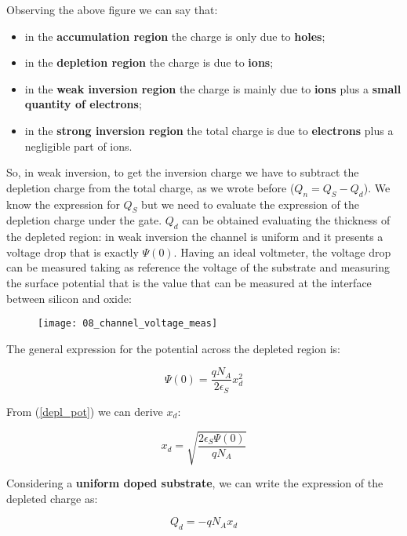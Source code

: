 \documentclass[a4paper, 12pt, twoside, openright]{report}
\begin{document}
Observing the above figure we can say that:

\begin{itemize}
\item in the \textbf{accumulation region} the charge is only due to \textbf{holes};
\item in the \textbf{depletion region} the charge is due to \textbf{ions};
\item in the \textbf{weak inversion region} the charge is mainly due to \textbf{ions} plus a \textbf{small quantity of electrons};
\item in the \textbf{strong inversion region} the total charge is due to \textbf{electrons} plus a negligible part of ions.
\end{itemize}

So, in weak inversion, to get the inversion charge we have to subtract the depletion charge from the total charge, as we wrote before ($Q_n = Q_S - Q_d$). We know the expression for $Q_{S}$ but we need to evaluate the expression of the  depletion charge under the gate. $Q_{d}$ can be obtained evaluating the thickness of the depleted region: in weak inversion the channel is uniform and it presents a voltage drop that is exactly $\Psi(0)$. Having an ideal voltmeter, the voltage drop can be measured taking as reference the voltage of the substrate and measuring the surface potential that is the value that can be measured at the interface between silicon and oxide:

	\begin{figure}[H]
	\centering
	\texttt{[image: 08\_channel\_voltage\_meas]}
	\caption{}
	\label{}
	\end{figure}

The general expression for the potential across the depleted region is:

\begin{equation}
\Psi(0) = \frac{qN_A}{2 \epsilon_S} x_d^2
\label{depl_pot}
\end{equation}

From (\ref{depl_pot}) we can derive $x_{d}$:

\begin{equation}
x_d = \sqrt{\frac{2 \epsilon_S \Psi(0)}{qN_A}}
\label{xd}
\end{equation}

Considering a \textbf{uniform doped substrate}, we can write the expression of the depleted charge as:

\begin{equation}
Q_d = -q N_A x_d
\label{Qd}
\end{equation}
\end{document}
